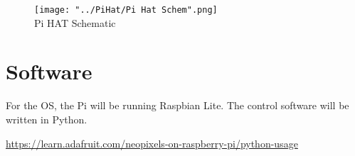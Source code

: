 \documentclass[a4paper,openany,nomultitoc]{dndbook}
\begin{document}
\begin{figure}[hb]
	\begin{center}
		\texttt{[image: "../PiHat/Pi Hat Schem".png]}\\
		{Pi HAT Schematic}
	\end{center}
\end{figure}

\FloatBarrier
\chapter{Software}
\FloatBarrier
\begin{multicols*}{2}

For the OS, the Pi will be running Raspbian Lite.  The control software will be written in Python.

\url{https://learn.adafruit.com/neopixels-on-raspberry-pi/python-usage}

\end{multicols*}
\end{document}
